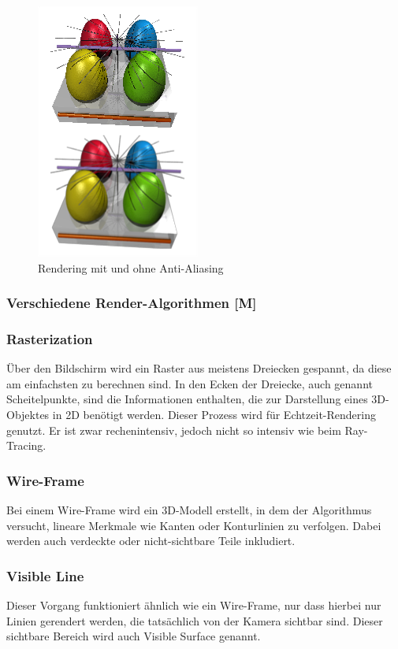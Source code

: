 \begin{figure} [h]
    \centering
    \includegraphics[scale=0.7]{pics/anti-aliasing.png}
    \caption{Rendering mit und ohne Anti-Aliasing \cite{AntiAliasing}}
    \label{fig:impl:anti-aliasing}
\end{figure}

\subsubsection{Verschiedene Render-Algorithmen [M]}
\subsubsection{Rasterization}
Über den Bildschirm wird ein Raster aus meistens Dreiecken gespannt, da diese am einfachsten zu berechnen sind. In den Ecken der Dreiecke, auch genannt Scheitelpunkte, sind die Informationen enthalten, die zur Darstellung eines 3D-Objektes in 2D benötigt werden. Dieser Prozess wird für Echtzeit-Rendering genutzt. Er ist zwar rechenintensiv, jedoch nicht so intensiv wie beim Ray-Tracing. \cite{RayTracingRasterization}

\subsubsection{Wire-Frame}
Bei einem Wire-Frame wird ein 3D-Modell erstellt, in dem der Algorithmus versucht, lineare Merkmale wie Kanten oder Konturlinien zu verfolgen. Dabei werden auch verdeckte oder nicht-sichtbare Teile inkludiert. 
\cite{Rendering3DModels} 

\subsubsection{Visible Line}
Dieser Vorgang funktioniert ähnlich wie ein Wire-Frame, nur dass hierbei nur Linien gerendert werden, die tatsächlich von der Kamera sichtbar sind. Dieser sichtbare Bereich wird auch Visible Surface genannt. 
\cite{Rendering3DModels} 

